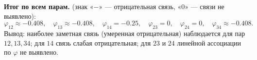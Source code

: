 \documentclass[12pt,a4paper]{article}
\begin{document}
\begin{enumerate}[label=\textbf{\arabic*.}]
\textbf{Итог по всем парам.} (знак «$-$» — отрицательная связь, «$0$» — связи не выявлено):
\[
\varphi_{12}\approx -0.408,\quad
\varphi_{13}\approx -0.408,\quad
\varphi_{14}=-0.25,\quad
\varphi_{23}=0,\quad
\varphi_{24}=0,\quad
\varphi_{34}\approx -0.408.
\]
Вывод: наиболее заметная связь (умеренная отрицательная) наблюдается для пар $12,13,34$; для $14$ связь слабая отрицательная; для $23$ и $24$ линейной ассоциации по $\varphi$ не выявлено.

\end{enumerate}
\end{document}
